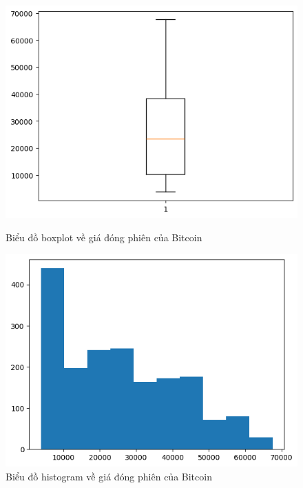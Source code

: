 \documentclass{ieeeojies}
\begin{document}
\begin{figure}[H]
    \centering
    \begin{minipage}{0.23\textwidth}
    \centering
    \includegraphics[width=1\textwidth]{bibliography/pictures/BTCboxplot.png}
    \caption{Biểu đồ boxplot về giá đóng phiên của Bitcoin}
    \label{fig:1}
    \end{minipage}
    \hfill
    \begin{minipage}{0.23\textwidth}
    \centering
    \includegraphics[width=1\textwidth]{bibliography/pictures/BTChistogram.png}
    \caption{Biểu đồ histogram về giá đóng phiên của Bitcoin}
    \label{fig:2}
    \end{minipage}
\end{figure}
\end{document}
